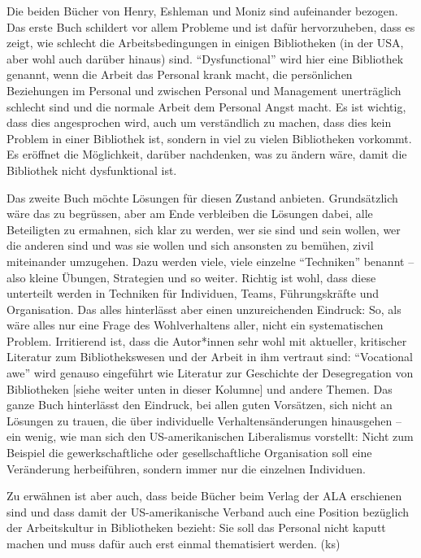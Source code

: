 \documentclass[a4paper,
fontsize=11pt,
oneside,
numbers=noperiodatend,
parskip=half-,
bibliography=totoc,
final
]{scrartcl}
\begin{document}
Die beiden Bücher von Henry, Eshleman und Moniz sind aufeinander
bezogen. Das erste Buch schildert vor allem Probleme und ist dafür
hervorzuheben, dass es zeigt, wie schlecht die Arbeitsbedingungen in
einigen Bibliotheken (in der USA, aber wohl auch darüber hinaus) sind.
\enquote{Dysfunctional} wird hier eine Bibliothek genannt, wenn die
Arbeit das Personal krank macht, die persönlichen Beziehungen im
Personal und zwischen Personal und Management unerträglich schlecht sind
und die normale Arbeit dem Personal Angst macht. Es ist wichtig, dass
dies angesprochen wird, auch um verständlich zu machen, dass dies kein
Problem in einer Bibliothek ist, sondern in viel zu vielen Bibliotheken
vorkommt. Es eröffnet die Möglichkeit, darüber nachdenken, was zu ändern
wäre, damit die Bibliothek nicht dysfunktional ist.

Das zweite Buch möchte Lösungen für diesen Zustand anbieten.
Grundsätzlich wäre das zu begrüssen, aber am Ende verbleiben die
Lösungen dabei, alle Beteiligten zu ermahnen, sich klar zu werden, wer
sie sind und sein wollen, wer die anderen sind und was sie wollen und
sich ansonsten zu bemühen, zivil miteinander umzugehen. Dazu werden
viele, viele einzelne \enquote{Techniken} benannt -- also kleine
Übungen, Strategien und so weiter. Richtig ist wohl, dass diese
unterteilt werden in Techniken für Individuen, Teams, Führungskräfte und
Organisation. Das alles hinterlässt aber einen unzureichenden Eindruck:
So, als wäre alles nur eine Frage des Wohlverhaltens aller, nicht ein
systematischen Problem. Irritierend ist, dass die Autor*innen sehr wohl
mit aktueller, kritischer Literatur zum Bibliothekswesen und der Arbeit
in ihm vertraut sind: \enquote{Vocational awe} wird genauso eingeführt
wie Literatur zur Geschichte der Desegregation von Bibliotheken {[}siehe
weiter unten in dieser Kolumne{]} und andere Themen. Das ganze Buch
hinterlässt den Eindruck, bei allen guten Vorsätzen, sich nicht an
Lösungen zu trauen, die über individuelle Verhaltensänderungen
hinausgehen -- ein wenig, wie man sich den US-amerikanischen
Liberalismus vorstellt: Nicht zum Beispiel die gewerkschaftliche oder
gesellschaftliche Organisation soll eine Veränderung herbeiführen,
sondern immer nur die einzelnen Individuen.

Zu erwähnen ist aber auch, dass beide Bücher beim Verlag der ALA
erschienen sind und dass damit der US-amerikanische Verband auch eine
Position bezüglich der Arbeitskultur in Bibliotheken bezieht: Sie soll
das Personal nicht kaputt machen und muss dafür auch erst einmal
thematisiert werden. (ks)
\end{document}
